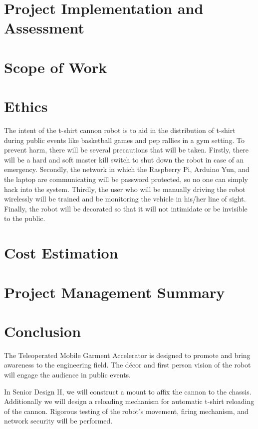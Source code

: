 \documentclass[letterpaper,12pt]{article}
\begin{document}
\section{Project Implementation and Assessment}
\section{Scope of Work}
\section{Ethics}
\noindent The intent of the t-shirt cannon robot is to aid in the distribution of t-shirt during public events like basketball games and pep rallies in a gym setting. To prevent harm, there will be several precautions that will be taken. Firstly, there will be a hard and soft master kill switch to shut down the robot in case of an emergency. Secondly, the network in which the Raspberry Pi, Arduino Yun, and the laptop are communicating will be password protected, so no one can simply hack into the system. Thirdly, the user who will be manually driving the robot wirelessly will be trained and be monitoring the vehicle in his/her line of sight. Finally, the robot will be decorated so that it will not intimidate or be invisible to the public. 

\section{Cost Estimation}
\section{Project Management Summary}
\section{Conclusion}
\noindent The Teleoperated Mobile Garment Accelerator is designed to promote and bring awareness to the engineering field. The décor and first person vision of the robot will engage the audience in public events.\newline

\noindent In Senior Design II, we will construct a mount to affix the cannon to the chassis. Additionally we will design a reloading mechanism for automatic t-shirt reloading of the cannon. Rigorous testing of the robot’s movement, firing mechanism, and network security will be performed.
\end{document}
